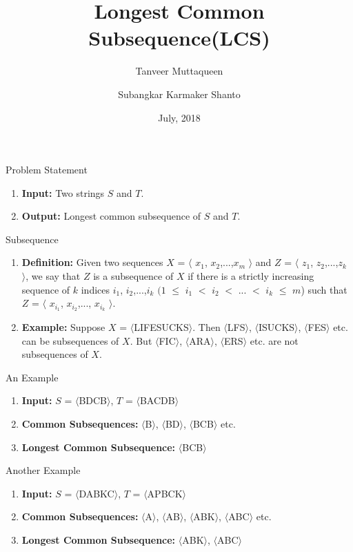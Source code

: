 \documentclass{beamer}
\title{Longest Common Subsequence(LCS)}
\author{Tanveer Muttaqueen \and Subangkar Karmaker Shanto}
\institute[Universities of Somewhere and Elsewhere] %
{
Department of Computer Science \& Engineering\\
Bangladesh University of Engineering and Technology
}
\date{July, 2018}
\begin{document}
\begin{frame}
  \titlepage
\end{frame}


\begin{frame}{Problem Statement}
\begin{enumerate}
    \onslide\item<1-> \textbf{Input:} Two strings $S$ and $T$. 
    \onslide\item<2-> \textbf{Output:} Longest common subsequence of $S$ and $T$.
\end{enumerate}
\end{frame}

\begin{frame}{Subsequence}
\begin{enumerate}
    \onslide\item<1-> \textbf{Definition:} Given two
sequences $X$ = $\langle$ $x_1$, $x_2$,...,$x_m$ $\rangle$ and $Z$  = $\langle$ $z_1$, $z_2$,...,$z_k$ $\rangle$, we say that $Z$ is a subsequence of $X$ if there is a strictly increasing sequence of $k$ indices $i_1$, $i_2$,...,$i_k$  $(1$ $\leq$ $i_1$ $<$ $i_2$ $<$ ... $<$ $i_k$ $\leq$ $m$) such that $Z$ = $\langle$ $x_{i_1}$, $x_{i_2}$,..., $x_{i_k}$ $\rangle$. 
    \onslide\item<2-> \textbf{Example:} Suppose $X$ = $\langle$LIFESUCKS$\rangle$. Then $\langle$LFS$\rangle$, $\langle$ISUCKS$\rangle$, $\langle$FES$\rangle$ etc. can be  subsequences of $X$. But $\langle$FIC$\rangle$, $\langle$ARA$\rangle$, $\langle$ERS$\rangle$ etc. are not subsequences of $X$. 
\end{enumerate}
\end{frame}


\begin{frame}{An Example}
\begin{enumerate}
    \onslide\item<1-> \textbf{Input:} $S$ = $\langle$BDCB$\rangle$,  $T$ = $\langle$BACDB$\rangle$
    \onslide\item<2-> \textbf{Common Subsequences:} $\langle$B$\rangle$, $\langle$BD$\rangle$, $\langle$BCB$\rangle$ etc.
    \onslide\item<3-> \textbf{Longest Common Subsequence:} $\langle$BCB$\rangle$
\end{enumerate}
\end{frame}



\begin{frame}{Another Example}
\begin{enumerate}
    \onslide\item<1-> \textbf{Input:} $S$ = $\langle$DABKC$\rangle$,  $T$ = $\langle$APBCK$\rangle$
    \onslide\item<2-> \textbf{Common Subsequences:} $\langle$A$\rangle$, $\langle$AB$\rangle$, $\langle$ABK$\rangle$, $\langle$ABC$\rangle$ etc.
    \onslide\item<3-> \textbf{Longest Common Subsequence:} $\langle$ABK$\rangle$, $\langle$ABC$\rangle$
\end{enumerate}
\end{frame}
\end{document}
